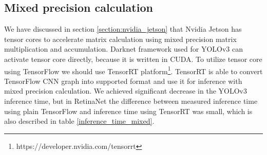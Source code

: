 \documentclass[twoside]{ctuthesis}
\theoremstyle{plain}
\theoremstyle{definition}
\theoremstyle{note}
\begin{document}
\subsection{Mixed precision calculation}
We have discussed in section \ref{section:nvidia_jetson} that Nvidia Jetson has tensor cores to accelerate matrix calculation using mixed precision matrix multiplication and accumulation. Darknet framework used for YOLOv3 can activate tensor core directly, because it is written in CUDA. To utilize tensor core using TensorFlow we should use TensorRT platform\footnote{https://developer.nvidia.com/tensorrt}. TensorRT is able to convert TensorFlow CNN graph into supported format and use it for inference with mixed precision calculation.
We achieved significant decrease in the YOLOv3 inference time, but in RetinaNet the difference between measured inference time using plain TensorFlow and inference time using TensorRT was small, which is also described in table \ref{inference_time_mixed}.
\end{document}
